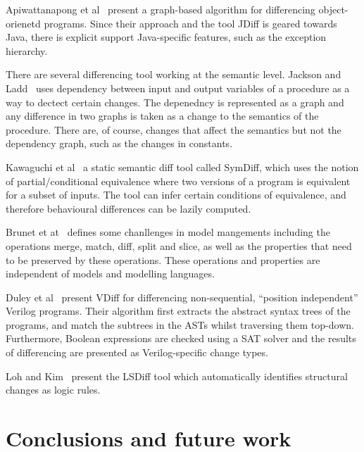 \documentclass[10pt, conference, compsocconf]{IEEEtran}
\begin{document}
{Apiwattanapong et al~\cite{Apiwattanapong:2004:DAO:1025115.1025202} present a graph-based algorithm for differencing object-orienetd programs. Since their approach and the tool JDiff is geared towards Java, there is explicit support Java-specific features, such as the exception hierarchy.




There are several differencing tool working at the semantic level. Jackson and Ladd~\cite{Jackson:1994:SDT:645543.655704} uses dependency between input and output variables of a procedure as a way to dectect certain changes. The depenedncy is represented as a graph and any difference in two graphs is taken as a change to the semantics of the procedure. There are, of course, changes that affect the semantics but not the dependency graph, such as the changes in constants.

Kawaguchi et al~\cite{Kawaguchietal2010} a static semantic diff tool called SymDiff, which uses the notion of partial/conditional equivalence where two versions of a program is equivalent for a subset of inputs.  The tool can infer certain conditions of equivalence, and therefore behavioural differences can be lazily computed. 

Brunet et at~\cite{brunet06gamma} defines some chanllenges in model mangements including the operations merge, match, diff, split and slice, as well as the properties that need to be preserved by these operations. These operations and properties are independent of models and modelling languages.

Duley et al~\cite{Duley:2010:PDA:1858996.1859093} present VDiff for differencing non-sequential, ``position independent'' Verilog programs. Their algorithm first extracts the abstract syntax trees of the programs, and match the subtrees in the ASTs whilst traversing them top-down. Furthermore, Boolean expressions are checked using a SAT solver and the results of differencing are presented as Verilog-specific change types.

Loh and Kim~\cite{Loh:2010:LPD:1810295.1810348,Kim:2009:DRS:1555001.1555046} present the LSDiff tool which automatically identifies structural changes as logic rules.

\section{Conclusions and future work}\label{sec:conclude}

}
\end{document}

